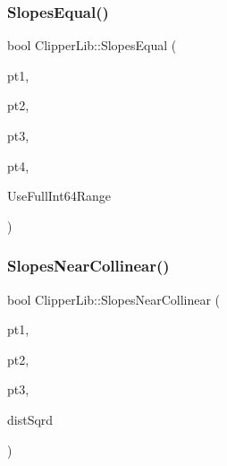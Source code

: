\subsubsection{\texorpdfstring{SlopesEqual()}{SlopesEqual()}\hspace{0.1cm}{\footnotesize\ttfamily [3/3]}}
{\footnotesize\ttfamily bool Clipper\+Lib\+::\+Slopes\+Equal (\begin{DoxyParamCaption}\item[{const \mbox{\hyperlink{struct_clipper_lib_1_1_int_point}{Int\+Point}}}]{pt1,  }\item[{const \mbox{\hyperlink{struct_clipper_lib_1_1_int_point}{Int\+Point}}}]{pt2,  }\item[{const \mbox{\hyperlink{struct_clipper_lib_1_1_int_point}{Int\+Point}}}]{pt3,  }\item[{const \mbox{\hyperlink{struct_clipper_lib_1_1_int_point}{Int\+Point}}}]{pt4,  }\item[{bool}]{Use\+Full\+Int64\+Range }\end{DoxyParamCaption})}

\mbox{\label{namespace_clipper_lib_a6a8d461810e4bcb5c67bf8e3026839b6}} 
\subsubsection{\texorpdfstring{SlopesNearCollinear()}{SlopesNearCollinear()}}
{\footnotesize\ttfamily bool Clipper\+Lib\+::\+Slopes\+Near\+Collinear (\begin{DoxyParamCaption}\item[{const \mbox{\hyperlink{struct_clipper_lib_1_1_int_point}{Int\+Point}} \&}]{pt1,  }\item[{const \mbox{\hyperlink{struct_clipper_lib_1_1_int_point}{Int\+Point}} \&}]{pt2,  }\item[{const \mbox{\hyperlink{struct_clipper_lib_1_1_int_point}{Int\+Point}} \&}]{pt3,  }\item[{double}]{dist\+Sqrd }\end{DoxyParamCaption})}

\mbox{\label{namespace_clipper_lib_ac299ceb4a2a28061aa452bd069e2c4a3}} 
